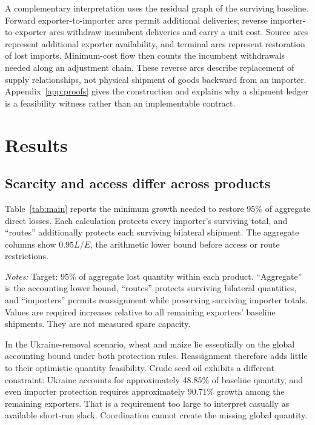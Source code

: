 \documentclass[11pt,a4paper]{article}
\begin{document}
A complementary interpretation uses the residual graph of the surviving baseline. Forward exporter-to-importer arcs permit additional deliveries; reverse importer-to-exporter arcs withdraw incumbent deliveries and carry a unit cost. Source arcs represent additional exporter availability, and terminal arcs represent restoration of lost imports. Minimum-cost flow then counts the incumbent withdrawals needed along an adjustment chain. These reverse arcs describe replacement of supply relationships, not physical shipment of goods backward from an importer. Appendix~\ref{app:proofs} gives the construction and explains why a shipment ledger is a feasibility witness rather than an implementable contract.

\section{Results}
\subsection{Scarcity and access differ across products}
Table~\ref{tab:main} reports the minimum growth needed to restore 95\% of aggregate direct losses. Each calculation protects every importer's surviving total, and ``routes'' additionally protects each surviving bilateral shipment. The aggregate columns show $0.95L/E$, the arithmetic lower bound before access or route restrictions.

\begin{table}[htbp]\centering\small
\caption{Required export availability growth in 2021 (percent)}\label{tab:main}

\begin{minipage}{\textwidth}\footnotesize\textit{Notes:} Target: 95\% of aggregate lost quantity within each product. ``Aggregate'' is the accounting lower bound, ``routes'' protects surviving bilateral quantities, and ``importers'' permits reassignment while preserving surviving importer totals. Values are required increases relative to all remaining exporters' baseline shipments. They are not measured spare capacity.\end{minipage}
\end{table}

In the Ukraine-removal scenario, wheat and maize lie essentially on the global accounting bound under both protection rules. Reassignment therefore adds little to their optimistic quantity feasibility. Crude seed oil exhibits a different constraint: Ukraine accounts for approximately 48.85\% of baseline quantity, and even importer protection requires approximately 90.71\% growth among the remaining exporters. That is a requirement too large to interpret casually as available short-run slack. Coordination cannot create the missing global quantity.
\end{document}
